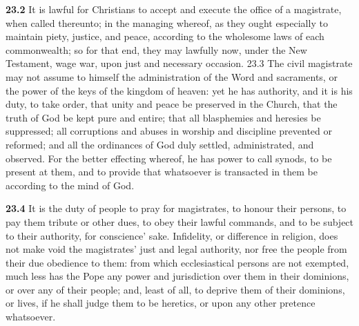 \par\textbf{23.2} It is lawful for Christians to accept and execute the office of a magistrate, when called thereunto; in the managing whereof, as they ought especially to maintain piety, justice, and peace, according to the wholesome laws of each commonwealth; so for that end, they may lawfully now, under the New Testament, wage war, upon just and necessary occasion.  23.3 The civil magistrate may not assume to himself the administration of the Word and sacraments, or the power of the keys of the kingdom of heaven: yet he has authority, and it is his duty, to take order, that unity and peace be preserved in the Church, that the truth of God be kept pure and entire; that all blasphemies and heresies be suppressed; all corruptions and abuses in worship and discipline prevented or reformed; and all the ordinances of God duly settled, administrated, and observed. For the better effecting whereof, he has power to call synods, to be present at them, and to provide that whatsoever is transacted in them be according to the mind of God.   

\par\textbf{23.4} It is the duty of people to pray for magistrates, to honour their persons, to pay them tribute or other dues, to obey their lawful commands, and to be subject to their authority, for conscience{}' sake. Infidelity, or difference in religion, does not make void the magistrates' just and legal authority, nor free the people from their due obedience to them: from which ecclesiastical persons are not exempted, much less has the Pope any power and jurisdiction over them in their dominions, or over any of their people; and, least of all, to deprive them of their dominions, or lives, if he shall judge them to be heretics, or upon any other pretence whatsoever.  

